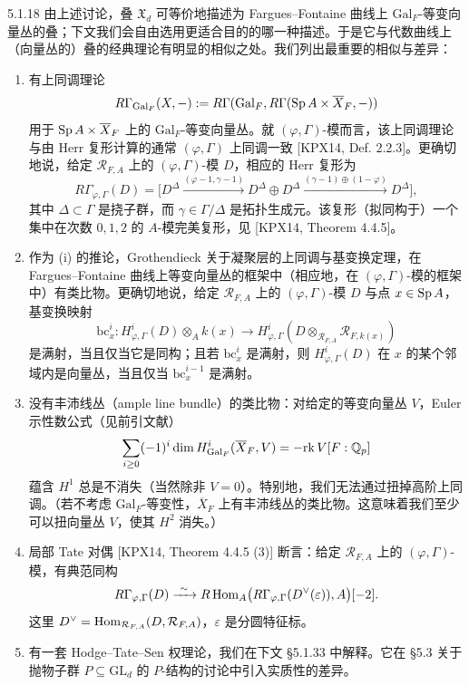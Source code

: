 \begin{rem}{5.1.18}\label{rem:a4-5-1-18}
由上述讨论，叠 $\mathfrak{X}_d$ 可等价地描述为 Fargues--Fontaine 曲线上 $\mathrm{Gal}_F$-等变向量丛的叠；下文我们会自由选用更适合目的的哪一种描述。于是它与代数曲线上（向量丛的）叠的经典理论有明显的相似之处。我们列出最重要的相似与差异：
\begin{enumerate}[label=(\roman*),leftmargin=2.6em,itemsep=0.2em]
\item 有上同调理论
\[
R\Gamma_{\mathrm{Gal}_F}(X,-):=R\Gamma(\mathrm{Gal}_F,R\Gamma(\operatorname{Sp} A\times\overline{X}_F,-))
\]
用于 $\operatorname{Sp} A\times\overline{X}_F$ 上的 $\mathrm{Gal}_F$-等变向量丛。就 $(\varphi,\Gamma)$-模而言，该上同调理论与由 Herr 复形计算的通常 $(\varphi,\Gamma)$ 上同调一致 [KPX14, Def. 2.2.3]。更确切地说，给定 $\mathcal{R}_{F,A}$ 上的 $(\varphi,\Gamma)$-模 $D$，相应的 Herr 复形为
\[
R\Gamma_{\varphi,\Gamma}(D)=\bigl[D^\Delta\xrightarrow{(\varphi-1,\gamma-1)}D^\Delta\oplus D^\Delta\xrightarrow{(\gamma-1)\oplus(1-\varphi)}D^\Delta\bigr],
\]
其中 $\Delta\subset\Gamma$ 是挠子群，而 $\gamma\in\Gamma/\Delta$ 是拓扑生成元。该复形（拟同构于）一个集中在次数 $0,1,2$ 的 $A$-模完美复形，见 [KPX14, Theorem 4.4.5]。
\item 作为 (i) 的推论，Grothendieck 关于凝聚层的上同调与基变换定理，在 Fargues--Fontaine 曲线上等变向量丛的框架中（相应地，在 $(\varphi,\Gamma)$-模的框架中）有类比物。更确切地说，给定 $\mathcal{R}_{F,A}$ 上的 $(\varphi,\Gamma)$-模 $D$ 与点 $x\in\operatorname{Sp} A$，基变换映射
\[
\mathrm{bc}^i_x:H^i_{\varphi,\Gamma}(D)\otimes_Ak(x)\longrightarrow H^i_{\varphi,\Gamma}(D\otimes_{\mathcal{R}_{F,A}}\mathcal{R}_{F,k(x)})
\]
是满射，当且仅当它是同构；且若 $\mathrm{bc}^i_x$ 是满射，则 $H^i_{\varphi,\Gamma}(D)$ 在 $x$ 的某个邻域内是向量丛，当且仅当 $\mathrm{bc}^{i-1}_x$ 是满射。
\item 没有丰沛线丛（ample line bundle）的类比物：对给定的等变向量丛 $V$，Euler 示性数公式（见前引文献）
\[
\sum_{i\ge0}(-1)^i\dim H^i_{\mathrm{Gal}_F}(\overline{X}_F,V)=-\mathrm{rk}\,V[F:\mathbb{Q}_p]
\]
蕴含 $H^1$ 总是不消失（当然除非 $V=0$）。特别地，我们无法通过扭掉高阶上同调。（若不考虑 $\mathrm{Gal}_F$-等变性，$\overline{X}_F$ 上有丰沛线丛的类比物。这意味着我们至少可以扭向量丛 $V$，使其 $H^2$ 消失。）
\item {}局部 Tate 对偶 [KPX14, Theorem 4.4.5 (3)] 断言：给定 $\mathcal{R}_{F,A}$ 上的 $(\varphi,\Gamma)$-模，有典范同构
\[
R\Gamma_{\varphi,\Gamma}(D)\xrightarrow{\ \sim\ }R\Hom_A\bigl(R\Gamma_{\varphi,\Gamma}(D^\vee(\varepsilon)),A\bigr)[-2].
\]
这里 $D^\vee=\operatorname{Hom}_{\mathcal{R}_{F,A}}(D,\mathcal{R}_{F,A})$，$\varepsilon$ 是分圆特征标。
\item 有一套 Hodge--Tate--Sen 权理论，我们在下文 §5.1.33 中解释。它在 §5.3 关于抛物子群 $P\subseteq\mathrm{GL}_d$ 的 $P$-结构的讨论中引入实质性的差异。
\end{enumerate}
\end{rem}

